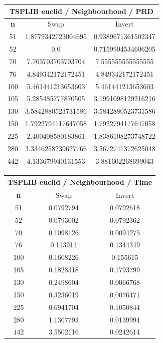 \documentclass{article}
\begin{document}
\begin{center}
\begin{tabular}{|c|c|c|}
\hline
\multicolumn{3}{|c|}{\textbf{TSPLIB euclid / Neighbourhood / PRD}}\\
\hline
\textbf{n} & Swap & Invert\\
\hline
51 & 1.8779342723004695 & 0.9389671361502347\\
\hline
52 & 0.0 & 0.7159904534606205\\
\hline
70 & 7.703703703703704 & 7.555555555555555\\
\hline
76 & 4.849342172172451 & 4.849342172172451\\
\hline
100 & 5.461441213653603 & 5.461441213653603\\
\hline
105 & 5.285485777870505 & 3.1991098129216216\\
\hline
130 & 3.5842880523731586 & 3.5842880523731586\\
\hline
150 & 1.7922794117647058 & 1.7922794117647058\\
\hline
225 & 2.400408580183861 & 1.8386108273748722\\
\hline
280 & 3.3346258239627766 & 3.5672741372625048\\
\hline
442 & 4.133679940131553 & 3.881602268699043\\
\hline
\end{tabular}
\end{center}


\begin{center}
\begin{tabular}{|c|c|c|}
\hline
\multicolumn{3}{|c|}{\textbf{TSPLIB euclid / Neighbourhood / Time}}\\
\hline
\textbf{n} & Swap & Invert\\
\hline
51 & 0.0792794 & 0.0792618\\
\hline
52 & 0.0793002 & 0.0792362\\
\hline
70 & 0.1098126 & 0.0094275\\
\hline
76 & 0.113911 & 0.1344349\\
\hline
100 & 0.1608226 & 0.155615\\
\hline
105 & 0.1828318 & 0.1793799\\
\hline
130 & 0.2498604 & 0.0066768\\
\hline
150 & 0.3236019 & 0.0076471\\
\hline
225 & 0.6941704 & 0.1050844\\
\hline
280 & 1.1307793 & 0.0139994\\
\hline
442 & 3.5502116 & 0.0242614\\
\hline
\end{tabular}
\end{center}
\end{document}
